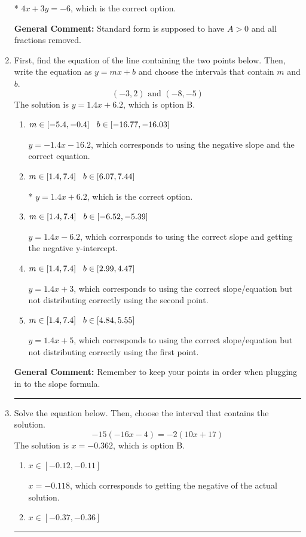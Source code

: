 \documentclass{extbook}[14pt]
\newcommand{\litem}[1]{\item #1

\rule{\textwidth}{0.4pt}}
\begin{document}
\begin{enumerate}
{\begin{enumerate}[label=\Alph*.]
* $4x + 3y = -6$, which is the correct option.
\end{enumerate}

\textbf{General Comment:} Standard form is supposed to have $A > 0$ and all fractions removed.
}
\litem{
First, find the equation of the line containing the two points below. Then, write the equation as $ y=mx+b $ and choose the intervals that contain $m$ and $b$.
\[ (-3, 2) \text{ and } (-8, -5) \]The solution is \( y = 1.4x + 6.2 \), which is option B.\begin{enumerate}[label=\Alph*.]
\item \( m \in [-5.4, -0.4] \hspace*{3mm} b \in [-16.77, -16.03] \)

 $y = -1.4x -16.2$, which corresponds to using the negative slope and the correct equation.
\item \( m \in [1.4, 7.4] \hspace*{3mm} b \in [6.07, 7.44] \)

* $y = 1.4x + 6.2$, which is the correct option.
\item \( m \in [1.4, 7.4] \hspace*{3mm} b \in [-6.52, -5.39] \)

 $y = 1.4x -6.2$, which corresponds to using the correct slope and getting the negative y-intercept.
\item \( m \in [1.4, 7.4] \hspace*{3mm} b \in [2.99, 4.47] \)

 $y = 1.4x + 3$, which corresponds to using the correct slope/equation but not distributing correctly using the second point.
\item \( m \in [1.4, 7.4] \hspace*{3mm} b \in [4.84, 5.55] \)

 $y = 1.4x + 5$, which corresponds to using the correct slope/equation but not distributing correctly using the first point.
\end{enumerate}

\textbf{General Comment:} Remember to keep your points in order when plugging in to the slope formula.
}
\litem{
Solve the equation below. Then, choose the interval that contains the solution.
\[ -15(-16x -4) = -2(10x + 17) \]The solution is \( x = -0.362 \), which is option B.\begin{enumerate}[label=\Alph*.]
\item \( x \in [-0.12, -0.11] \)

$x = -0.118$, which corresponds to getting the negative of the actual solution.
\item \( x \in [-0.37, -0.36] \)


\end{enumerate}}
\end{enumerate}
\end{document}
